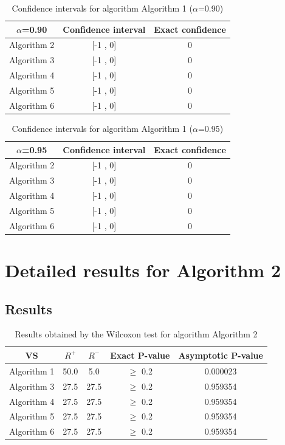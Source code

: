 \documentclass[a4paper,10pt]{article}
\begin{document}
\begin{table}[!htp]
\centering\small
\begin{tabular}{
|c|c|c|}
\hline
 $\alpha$=0.90 & Confidence interval & Exact confidence \\ \hline 
Algorithm 2 & [-1 , 0] & 0\\ \hline 
Algorithm 3 & [-1 , 0] & 0\\ \hline 
Algorithm 4 & [-1 , 0] & 0\\ \hline 
Algorithm 5 & [-1 , 0] & 0\\ \hline 
Algorithm 6 & [-1 , 0] & 0\\ \hline 

\end{tabular}
\caption{Confidence intervals for algorithm Algorithm 1 ($\alpha$=0.90)}
\end{table}
\begin{table}[!htp]
\centering\small
\begin{tabular}{
|c|c|c|}
\hline
 $\alpha$=0.95 & Confidence interval & Exact confidence \\ \hline 
Algorithm 2 & [-1 , 0] & 0\\ \hline 
Algorithm 3 & [-1 , 0] & 0\\ \hline 
Algorithm 4 & [-1 , 0] & 0\\ \hline 
Algorithm 5 & [-1 , 0] & 0\\ \hline 
Algorithm 6 & [-1 , 0] & 0\\ \hline 

\end{tabular}
\caption{Confidence intervals for algorithm Algorithm 1 ($\alpha$=0.95)}
\end{table}

 \clearpage 


\section{Detailed results for Algorithm 2}


\subsection{Results}

\begin{table}[!htp]
\centering\small
\begin{tabular}{
|c|c|c|c|c|}
\hline
 VS & $R^{+}$ & $R^{-}$ & Exact P-value & Asymptotic P-value \\ \hline 
Algorithm 1 & 50.0 & 5.0 & $\geq$ 0.2 & 0.000023\\ \hline 
Algorithm 3 & 27.5 & 27.5 & $\geq$ 0.2 & 0.959354\\ \hline 
Algorithm 4 & 27.5 & 27.5 & $\geq$ 0.2 & 0.959354\\ \hline 
Algorithm 5 & 27.5 & 27.5 & $\geq$ 0.2 & 0.959354\\ \hline 
Algorithm 6 & 27.5 & 27.5 & $\geq$ 0.2 & 0.959354\\ \hline 

\end{tabular}
\caption{Results obtained by the Wilcoxon test for algorithm Algorithm 2}
\end{table}
\end{document}
